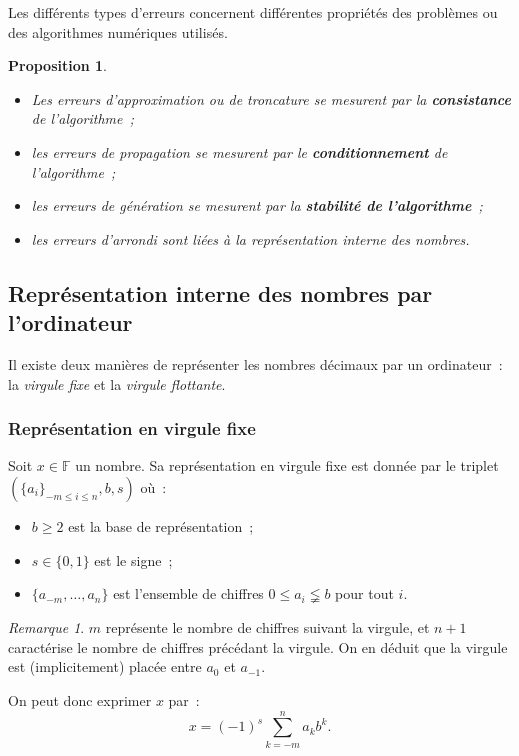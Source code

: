 \documentclass{article}
\newtheorem{prp}[thm]{Proposition}
\theoremstyle{definition}
\theoremstyle{remark}
\newtheorem*{rmq}{Remarque}
\newcommand{\F}{\mathbb F}
\begin{document}
		Les différents types d'erreurs concernent différentes propriétés des problèmes ou des algorithmes numériques utilisés.

		\begin{prp}~
		\begin{itemize}
			\item Les erreurs d'approximation ou de troncature se mesurent par la \textbf{consistance} de l'algorithme~;
			\item les erreurs de propagation se mesurent par le \textbf{conditionnement} de l'algorithme~;
			\item les erreurs de génération se mesurent par la \textbf{stabilité de l'algorithme}~;
			\item les erreurs d'arrondi sont liées à la représentation interne des nombres.
		\end{itemize}
		\end{prp}

	\subsection{Représentation interne des nombres par l'ordinateur}
		Il existe deux manières de représenter les nombres décimaux par un ordinateur~: la \emph{virgule fixe} et la \emph{virgule flottante}.

		\subsubsection{Représentation en virgule fixe}
		Soit $x \in \F$ un nombre. Sa représentation en virgule fixe est donnée par le triplet $(\{a_i\}_{-m \leq i \leq n}, b, s)$ où~:
		\begin{itemize}
			\item $b \geq 2$ est la base de représentation~;
			\item $s \in \{0, 1\}$ est le signe~;
			\item $\{a_{-m}, \dotsc, a_n\}$ est l'ensemble de chiffres $0 \leq a_i \lneqq b$ pour tout $i$.
		\end{itemize}

		\begin{rmq} $m$ représente le nombre de chiffres suivant la virgule, et $n+1$ caractérise le nombre de chiffres précédant la virgule. On en déduit que
		la virgule est (implicitement) placée entre $a_0$ et $a_{-1}$.
		\end{rmq}

		On peut donc exprimer $x$ par~:
		\[x = (-1)^s\sum_{k=-m}^na_kb^k.\]
\end{document}
